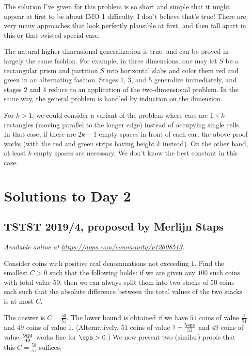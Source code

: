 \documentclass[11pt]{scrartcl}
\begin{document}
\begin{remark*}
  The solution I've given for this problem is so short
  and simple that it might appear at first
  to be about IMO 1 difficulty. I don't believe that's true!
  There are very many approaches that look perfectly plausible at first,
  and then fall apart in this or that twisted special case.
\end{remark*}

\begin{remark*}
  The natural higher-dimensional generalization
  is true, and can be proved in largely the same fashion.
  For example, in three dimensions,
  one may let $S$ be a rectangular prism
  and partition $S$ into horizontal slabs
  and color them red and green in an alternating fashion.
  Stages 1, 3, and 5 generalize immediately,
  and stages 2 and 4 reduce to an application of the two-dimensional problem.
  In the same way, the general problem is handled by induction on the dimension.
\end{remark*}

\begin{remark*}
  For $k > 1$, we could consider a variant of the problem
  where cars are $1 \times k$ rectangles (moving parallel to the longer edge)
  instead of occupying single cells.
  In that case, if there are $2k-1$ empty spaces in front of each car,
  the above proof works
  (with the red and green strips having height $k$ instead).
  On the other hand, at least $k$ empty spaces are necessary.
  We don't know the best constant in this case.
\end{remark*}
\pagebreak

\section{Solutions to Day 2}
\subsection{TSTST 2019/4, proposed by Merlijn Staps}
\textsl{Available online at \url{https://aops.com/community/p12608513}.}
\begin{mdframed}[style=mdpurplebox,frametitle={Problem statement}]
Consider coins with positive real denominations not exceeding $1$.
Find the smallest $C>0$ such that the following holds:
if we are given any $100$ such coins
with total value $50$, then we can
always split them into two stacks
of $50$ coins each such that the absolute difference
between the total values of the two stacks is at most $C$.
\end{mdframed}
The answer is $C = \frac{50}{51}$.
The lower bound is obtained
if we have $51$ coins of value $\frac{1}{51}$
and $49$ coins of value $1$.
(Alternatively, $51$ coins of value $1-\frac{\eps}{51}$
and $49$ coins of value $\frac{\eps}{49}$ works fine for $\eps > 0$.)
We now present two (similar)
proofs that this $C = \frac{50}{51}$ suffices.
\end{document}
